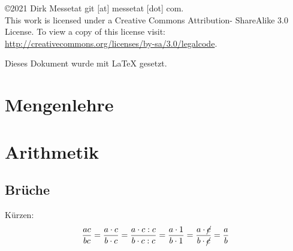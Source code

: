 \documentclass[12pt,a4paper,fleqn,twoside,pdf,final]{article}
\newcommand{\stkout}[1]{\ifmmode\text{\cancel{\ensuremath{#1}}}\else\sout{#1}\fi}
\begin{document}
\maketitle
\thispagestyle{empty}


\vfill
 

\begin{flushright}
    \copyright  2021 Dirk Messetat git [at] messetat [dot] com. \\
    This work is licensed under a Creative Commons Attribution- ShareAlike 3.0 License.
    To view a copy of this license visit:
     \url{http://creativecommons.org/licenses/by-sa/3.0/legalcode}.
\end{flushright}

\pagebreak



\setcounter{tocdepth}{1}
\tableofcontents
\thispagestyle{empty}


\vfill

\begin{center}
\small{Dieses Dokument wurde mit \LaTeX{} gesetzt.}
\end{center}

%
\newpage
%

\clearpage
{} 



\section{Mengenlehre}


\section{Arithmetik}
\subsection{Brüche}

Kürzen:
\begin{align*}
\frac{ac}{bc} = \frac{a \cdot c}{b \cdot c} =  \frac{a \cdot c : c }{b \cdot c : c} =  \frac{a \cdot 1 }{b \cdot 1 } =  \frac{a \cdot \stkout{c} }{b \cdot \stkout{c}}  =  \frac{a}{b}  
\end{align*}
\end{document}
